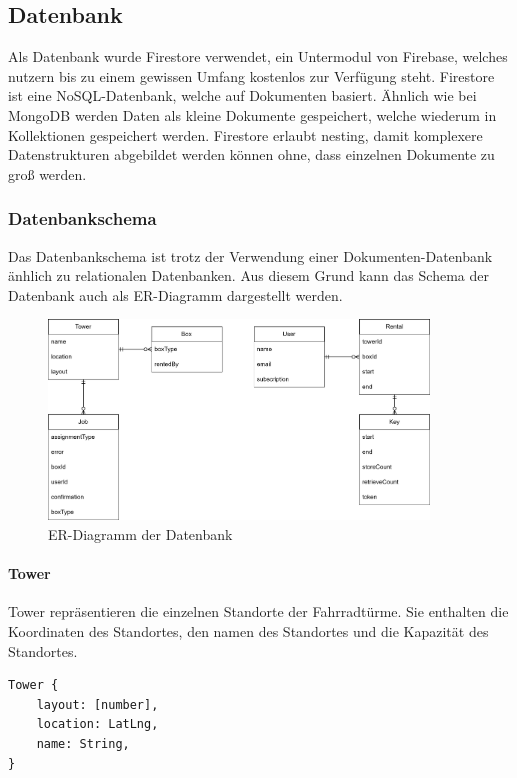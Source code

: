 \subsection{Datenbank}

Als Datenbank wurde Firestore verwendet, ein Untermodul von Firebase, welches nutzern bis zu einem gewissen Umfang kostenlos zur Verfügung steht. Firestore ist eine NoSQL-Datenbank, welche auf Dokumenten basiert. Ähnlich wie bei MongoDB werden Daten als kleine Dokumente gespeichert, welche wiederum in Kollektionen gespeichert werden. Firestore erlaubt nesting, damit komplexere Datenstrukturen abgebildet werden können ohne, dass einzelnen Dokumente zu groß werden.



\subsubsection{Datenbankschema}
Das Datenbankschema ist trotz der Verwendung einer Dokumenten-Datenbank änhlich zu relationalen Datenbanken. Aus diesem Grund kann das Schema der Datenbank auch als ER-Diagramm dargestellt werden.

\begin{figure}[ht]
    \centering
    \includegraphics[width=0.9\textwidth]{images/datenbankstruktur.png}
    \caption{ER-Diagramm der Datenbank}
    \label{fig:er_diagramm}
\end{figure}

\paragraph{Tower}
Tower repräsentieren die einzelnen Standorte der Fahrradtürme. Sie enthalten die Koordinaten des Standortes, den namen des Standortes und die Kapazität des Standortes.

\begin{verbatim}
Tower {
    layout: [number],
    location: LatLng,
    name: String,
}
\end{verbatim}


